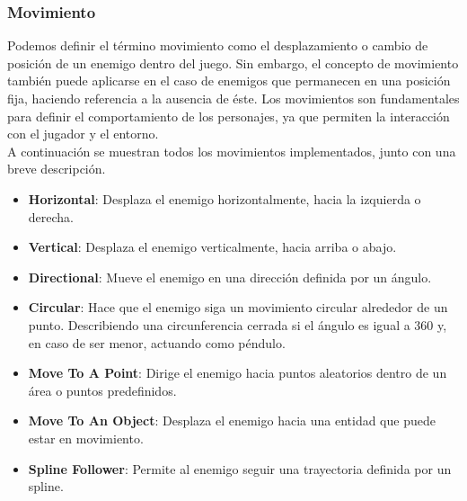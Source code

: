 \subsubsection{Movimiento}
Podemos definir el término movimiento como el desplazamiento o cambio de posición de un enemigo dentro del juego. Sin embargo, el concepto de movimiento también puede aplicarse en el caso de enemigos que permanecen en una posición fija, haciendo referencia a la ausencia de éste. Los movimientos son fundamentales para definir el comportamiento de los personajes, ya que permiten la interacción con el jugador y el entorno.\\
A continuación se muestran todos los movimientos implementados, junto con una breve descripción.
\begin{itemize}
  \item \textbf{Horizontal}: Desplaza el enemigo horizontalmente, hacia la izquierda o derecha.
    \item \textbf{Vertical}: Desplaza el enemigo verticalmente, hacia arriba o abajo.
    \item \textbf{Directional}: Mueve el enemigo en una dirección definida por un ángulo.
    \item \textbf{Circular}: Hace que el enemigo siga un movimiento circular alrededor de un punto. Describiendo una circunferencia cerrada si el ángulo es igual a 360 y, en caso de ser menor, actuando como péndulo.
    \item \textbf{Move To A Point}: Dirige el enemigo hacia puntos aleatorios dentro de un área o puntos predefinidos.
    \item \textbf{Move To An Object}: Desplaza el enemigo hacia una entidad que puede estar en movimiento.
    \item \textbf{Spline Follower}: Permite al enemigo seguir una trayectoria definida por un spline.
\end{itemize}
